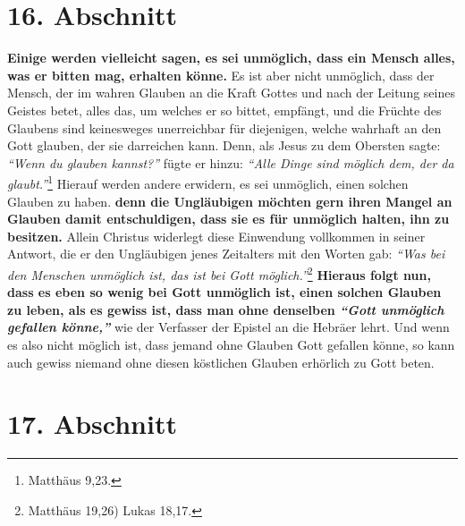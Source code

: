 \section{16. Abschnitt} \label{kap6_ab16}

\label{ref:06_14_gebetserfuellung}
\textbf{Einige werden vielleicht sagen, es sei unmöglich, dass ein Mensch alles,
was er
bitten mag, erhalten könne.} Es ist aber nicht unmöglich, dass der Mensch, der
im
wahren Glauben an die Kraft Gottes und nach der Leitung seines Geistes betet,
alles das, um welches er so bittet, empfängt, und die Früchte des Glaubens sind
keinesweges unerreichbar für diejenigen, welche wahrhaft an den Gott glauben,
der sie darreichen kann. Denn, als Jesus zu dem Obersten sagte:
\textit{"`Wenn du glauben kannst?"'} fügte er hinzu: \textit{"`Alle Dinge sind
möglich dem, der da glaubt."'}\footnote{Matthäus 9,23.}
Hierauf werden andere erwidern, es sei
unmöglich, einen solchen Glauben zu haben. \textbf{denn die Ungläubigen möchten
gern
ihren Mangel an Glauben damit entschuldigen, dass
sie es für unmöglich halten,
ihn zu besitzen.} Allein Christus widerlegt diese Einwendung vollkommen in
seiner
Antwort, die er den Ungläubigen jenes Zeitalters mit den Worten gab:
\textit{"`Was bei den Menschen unmöglich ist, das ist bei Gott
möglich."'}\footnote{Matthäus 19,26) Lukas 18,17.}
\textbf{Hieraus folgt nun, dass es eben so wenig bei Gott unmöglich
ist,
einen solchen Glauben zu leben, als es gewiss ist, dass man ohne denselben
\textit{"`Gott unmöglich gefallen könne,"'}} wie der Verfasser der Epistel an
die Hebräer
lehrt. Und wenn es also nicht möglich ist, dass jemand ohne Glauben Gott
gefallen könne, so kann auch gewiss niemand ohne diesen köstlichen Glauben
erhörlich zu Gott beten.

\section{17. Abschnitt} \label{kap6_ab17}

